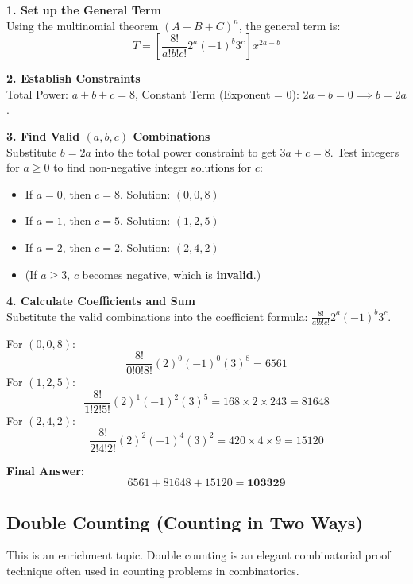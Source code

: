 \documentclass[12pt]{article}
\newenvironment{remark}[1][]{%
  \begin{remarkbox}[title={\bfseries Remark~\thetcbcounter\ifx\relax#1\relax\else\ (#1)\fi}]%
}{%
  \end{remarkbox}%
}
\begin{document}
\begin{solutionbox*}[Solution]
\textbf{1. Set up the General Term}\\
Using the multinomial theorem $(A + B + C)^n$, the general term is:
\[
T = \left[ \frac{8!}{a! b! c!} 2^a (-1)^b 3^c \right] x^{2a - b}
\]

\textbf{2. Establish Constraints}\\
Total Power: $a + b + c = 8$, Constant Term (Exponent = 0): $2a - b = 0 \implies b = 2a$.

\textbf{3. Find Valid $(a, b, c)$ Combinations}\\
Substitute $b = 2a$ into the total power constraint to get $3a + c = 8$. Test integers for $a \ge 0$ to find non-negative integer solutions for $c$:
\begin{itemize}[leftmargin=*]
\item If $a = 0$, then $c = 8$. Solution: \textbf{$(0, 0, 8)$}
\item If $a = 1$, then $c = 5$. Solution: \textbf{$(1, 2, 5)$}
\item If $a = 2$, then $c = 2$. Solution: \textbf{$(2, 4, 2)$}
\item (If $a \ge 3$, $c$ becomes negative, which is \textbf{invalid}.)
\end{itemize}

\textbf{4. Calculate Coefficients and Sum}\\
Substitute the valid combinations into the coefficient formula: $\frac{8!}{a! b! c!} 2^a (-1)^b 3^c$.

For $(0, 0, 8)$:
\[
\frac{8!}{0! 0! 8!} (2)^0 (-1)^0 (3)^8 = 6561
\]
For $(1, 2, 5)$:
\[
\frac{8!}{1! 2! 5!} (2)^1 (-1)^2 (3)^5 = 168 \times 2 \times 243 = 81648
\]
For $(2, 4, 2)$:
\[
\frac{8!}{2! 4! 2!} (2)^2 (-1)^4 (3)^2 = 420 \times 4 \times 9 = 15120
\]

\textbf{Final Answer:}\\
\[
6561 + 81648 + 15120 = \mathbf{103329}
\]
\end{solutionbox*}

\subsection{Double Counting (Counting in Two Ways)}
\begin{remark}[Syllabus Note]
This is an enrichment topic. Double counting is an elegant combinatorial proof technique often used in counting problems in combinatorics.
\end{remark}
\end{document}
